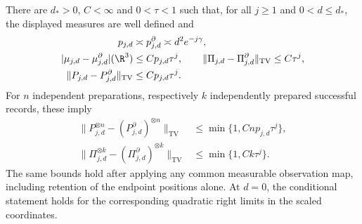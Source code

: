 \begin{theorem}
\label{thm:v6-transfer}
There are $d_*>0$, $C<\infty$ and $0<\tau<1$ such that, for all
$j\ge1$ and $0<d\le d_*$, the displayed measures are well defined and
\begin{align}
 p_{j,d}&\asymp p^\partial_{j,d}\asymp d^2e^{-j\gamma},
                                                  \label{eq:v6-rare-mass}\\
 |\mu_{j,d}-\mu^\partial_{j,d}|(\R^3)
       &\le C p_{j,d}\tau^j,\qquad
 \|\Pi_{j,d}-\Pi^\partial_{j,d}\|_{\mathrm{TV}}
       \le C\tau^j,                              \label{eq:v6-tv}\\
 \|P_{j,d}-P^\partial_{j,d}\|_{\mathrm{TV}}
       &\le C p_{j,d}\tau^j.                     \label{eq:v6-raw-tv}
\end{align}
For $n$ independent preparations, respectively $k$ independently
prepared successful records, these imply
\begin{align}
 \|P_{j,d}^{\otimes n}-(P^\partial_{j,d})^{\otimes n}\|_{\mathrm{TV}}
       &\le \min\{1,Cnp_{j,d}\tau^j\},           \label{eq:v6-product-raw}\\
 \|\Pi_{j,d}^{\otimes k}-(\Pi^\partial_{j,d})^{\otimes k}\|_{\mathrm{TV}}
       &\le \min\{1,Ck\tau^j\}.                 \label{eq:v6-product-selected}
\end{align}
The same bounds hold after applying any common measurable observation
map, including retention of the endpoint positions alone. At $d=0$,
the conditional statement holds for the corresponding quadratic right
limits in the scaled coordinates.
\end{theorem}

